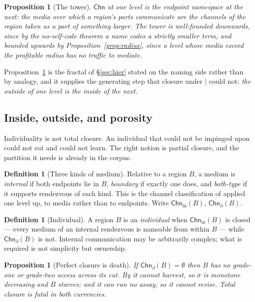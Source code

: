 \documentclass[11pt]{article}
\theoremstyle{plain}
\newtheorem{proposition}[theorem]{Proposition}
\theoremstyle{definition}
\newtheorem{definition}[theorem]{Definition}
\theoremstyle{remark}
\newcommand{\Chn}{\mathsf{Chn}}
\begin{document}
\begin{proposition}[The tower]\label{prop:tower}
$\Chn$ at one level is the endpoint namespace at the next: the media over
which a region's parts communicate are the channels of the region taken as
a part of something larger. The tower is well-founded downwards, since by
the no-self-code theorem a name codes a strictly smaller term, and bounded
upwards by Proposition~\ref{prop:radius}, since a level whose media exceed
the profitable radius has no traffic to mediate.
\end{proposition}

Proposition~\ref{prop:tower} is the fractal of \S\ref{sec:hier} stated on
the naming side rather than by analogy, and it supplies the generating step
that closure under $\mid$ could not: \emph{the outside of one level is the
inside of the next}.

\subsection{Inside, outside, and porosity}
\label{sec:porous}

Individuality is not total closure. An individual that could not be
impinged upon could not eat and could not learn. The right notion is
partial closure, and the partition it needs is already in the corpus.

\begin{definition}[Three kinds of medium]\label{def:three}
Relative to a region $B$, a medium is \emph{internal} if both endpoints lie
in $B$, \emph{boundary} if exactly one does, and \emph{both-type} if it
supports rendezvous of each kind. This is the channel classification of
\cite[\S12.6]{scientist} applied one level up, to media rather than to
endpoints. Write $\Chn_{\mathrm{in}}(B)$, $\Chn_{\partial}(B)$.
\end{definition}

\begin{definition}[Individual]\label{def:indiv}
A region $B$ is an \emph{individual} when $\Chn_{\mathrm{in}}(B)$ is closed
--- every medium of an internal rendezvous is nameable from within $B$ ---
while $\Chn_{\partial}(B)$ is not. Internal communication may be
arbitrarily complex; what is required is not simplicity but ownership.
\end{definition}

\begin{proposition}[Perfect closure is death]\label{prop:closuredeath}
If $\Chn_{\partial}(B) = \emptyset$ then $B$ has no grade-one or grade-two
access across its cut. By \cite[\S5]{scientist} it cannot harvest, so
$\sigma$ is monotone decreasing and $B$ starves; and it can run no assay,
so it cannot revise. Total closure is fatal in both currencies.
\end{proposition}
\end{document}
